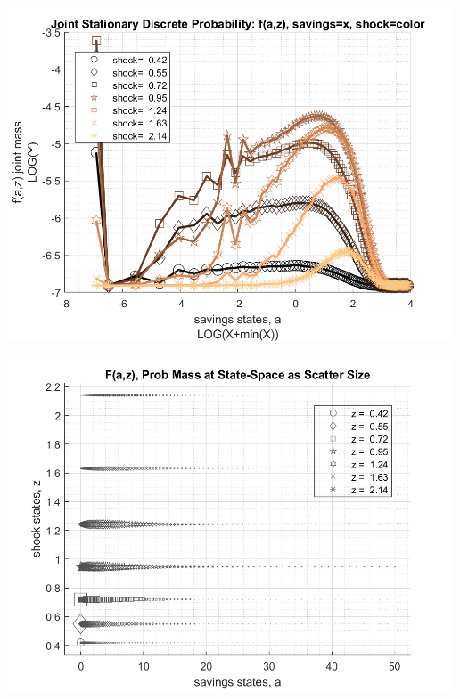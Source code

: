 \documentclass[
]{book}
\begin{document}
\includegraphics[width=5.20833in,height=\textheight]{img/fx_ds_az_cts_loop_images/figure_5.png}

\includegraphics[width=5.20833in,height=\textheight]{img/fx_ds_az_cts_loop_images/figure_6.png}
\end{document}
